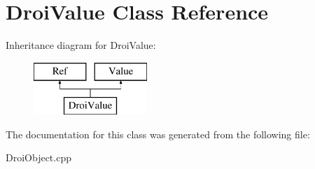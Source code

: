 \hypertarget{class_droi_value}{}\section{Droi\+Value Class Reference}
\label{class_droi_value}
Inheritance diagram for Droi\+Value\+:\begin{figure}[H]
\begin{center}
\leavevmode
\includegraphics[height=2.000000cm]{d8/d5d/class_droi_value}
\end{center}
\end{figure}


The documentation for this class was generated from the following file\+:\begin{DoxyCompactItemize}
\item 
Droi\+Object.\+cpp\end{DoxyCompactItemize}
